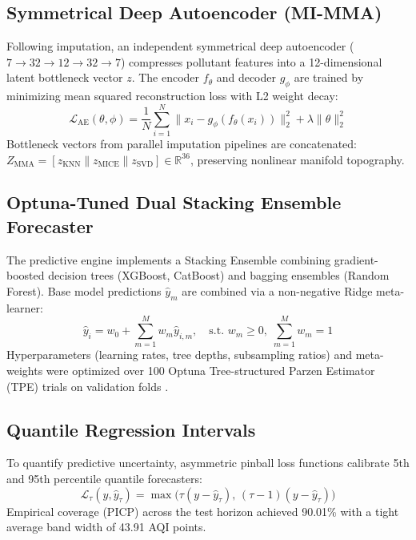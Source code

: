 \documentclass[conference]{IEEEtran}
\begin{document}
\subsection{Symmetrical Deep Autoencoder (MI-MMA)}
Following imputation, an independent symmetrical deep autoencoder ($7 \to 32 \to 12 \to 32 \to 7$) compresses pollutant features into a 12-dimensional latent bottleneck vector $z$. The encoder $f_\theta$ and decoder $g_\phi$ are trained by minimizing mean squared reconstruction loss with L2 weight decay:
\begin{equation}
\mathcal{L}_{\text{AE}}(\theta, \phi) = \frac{1}{N} \sum_{i=1}^N \| x_i - g_\phi(f_\theta(x_i)) \|_2^2 + \lambda \| \theta \|_2^2
\end{equation}
Bottleneck vectors from parallel imputation pipelines are concatenated: $Z_{\text{MMA}} = [z_{\text{KNN}} \parallel z_{\text{MICE}} \parallel z_{\text{SVD}}] \in \mathbb{R}^{36}$, preserving nonlinear manifold topography.

\subsection{Optuna-Tuned Dual Stacking Ensemble Forecaster}
The predictive engine implements a Stacking Ensemble combining gradient-boosted decision trees (XGBoost, CatBoost) and bagging ensembles (Random Forest). Base model predictions $\hat{y}_m$ are combined via a non-negative Ridge meta-learner:
\begin{equation}
\hat{y}_i = w_0 + \sum_{m=1}^M w_m \hat{y}_{i,m}, \quad \text{s.t. } w_m \ge 0, \; \sum_{m=1}^M w_m = 1
\end{equation}
Hyperparameters (learning rates, tree depths, subsampling ratios) and meta-weights were optimized over 100 Optuna Tree-structured Parzen Estimator (TPE) trials on validation folds \cite{akiba2019}.

\subsection{Quantile Regression Intervals}
To quantify predictive uncertainty, asymmetric pinball loss functions calibrate 5th and 95th percentile quantile forecasters:
\begin{equation}
\mathcal{L}_\tau(y, \hat{y}_\tau) = \max \big( \tau (y - \hat{y}_\tau), \, (\tau - 1)(y - \hat{y}_\tau) \big)
\end{equation}
Empirical coverage (PICP) across the test horizon achieved 90.01\% with a tight average band width of 43.91 AQI points.
\end{document}
